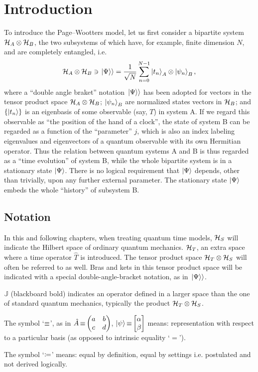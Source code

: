 \section{Introduction}

To introduce the Page--Wootters model, let us first consider
a bipartite system $\mathcal{H}_A \otimes \mathcal{H}_B$,
the two subsystems of which have, for example, finite dimension $N$,
and are completely
entangled, i.e.
$$
  \mathcal{H}_A \otimes \mathcal{H}_B \ni \left.\left| \Psi \right\rangle\right\rangle
  =
  \frac{1}{\sqrt{N}} \sum_{n=0}^{N-1} \ket{t_n}_{A} \otimes \ket{\psi_{n}}_{B} \text{,}
$$
where
a ``double angle braket'' notation $\left.\left| \Psi \right\rangle\right\rangle$ has been adopted
for vectors in the tensor product space $\mathcal{H}_A \otimes \mathcal{H}_B$;
$\ket{\psi_{n}}_{B}$ are normalized states vectors in $\mathcal{H}_B$;
and
$\qty{\ket{t_n}}$ is an eigenbasis of some observable (say, $T$) in system A.
%
If we regard this observable as ``the position of the hand of a clock'',
the state of system B can be regarded as a function of the ``parameter'' $j$,
which is also an index labeling
eigenvalues and eigenvectors of a quantum observable
with its own Hermitian operator.
Thus the relation between quantum systems A and B is thus regarded as
a ``time evolution'' of system B,
while the whole bipartite system
is in a stationary state
$\ket{\Psi}$.
There is no logical requirement that $\ket{\Psi}$
depends, other than trivially,
upon any further external parameter.
The stationary state $\ket{\Psi}$ embeds the whole ``history''
of subsystem B.

\subsection*{Notation}

In this and following chapters, when treating quantum time models,
$\mathcal{H}_S$ will indicate the Hilbert space of ordinary quantum mechanics.
$\mathcal{H}_T$, an extra space where a time operator $\hat{T}$ is introduced. The tensor
product space $\mathcal{H}_T \otimes \mathcal{H}_S$
will often be referred to as well.
Bras and kets in this tensor product space will be indicated with a special double-angle-bracket
notation, as in $\left.\left| \Psi \right\rangle\right\rangle$.

${\mathbb{J}}$ (blackboard bold) indicates an  operator defined in
a larger space than the one of standard quantum mechanics,
typically the product $\mathcal{H}_T \otimes \mathcal{H}_S$.

The symbol `$\operatorname*{\equiv}$', as in $\hat{A} \repr \mqty(a&b\\c&d)$, $\ket{\psi} \repr \mqty[\alpha \\ \beta]$
means: representation with respect to a particular basis (as opposed to intrinsic equality `$=$').

The symbol `$\coloneqq$'
means: equal by definition, equal by settings i.e. postulated and not derived logically.
